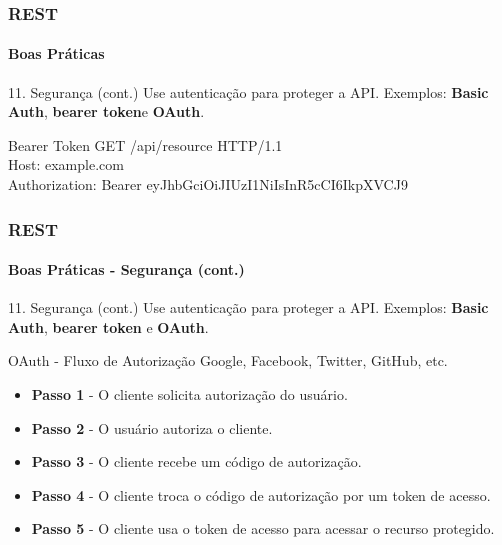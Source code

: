 \documentclass[
	10pt, %
	t, %
]{beamer}
\begin{document}
\begin{frame}
	\frametitle{REST}
	\framesubtitle{Boas Práticas}
	
	\begin{block}{11. Segurança (cont.)}
		Use autenticação para proteger a API. Exemplos: 
		\textbf{Basic Auth}, 
		\textbf{bearer token}\footnotemark e 
		\textbf{OAuth}.
	\end{block}

	\begin{exampleblock}{Bearer Token}
		{ \small GET /api/resource HTTP/1.1 } \\
		{ \small Host: example.com } \\
		{ \small Authorization: Bearer eyJhbGciOiJIUzI1NiIsInR5cCI6IkpXVCJ9 } \\
	\end{exampleblock}


\end{frame}

\begin{frame}
	\frametitle{REST}
	\framesubtitle{Boas Práticas - Segurança (cont.)}
	
	\begin{block}{11. Segurança (cont.)}
		Use autenticação para proteger a API. Exemplos: 
		\textbf{Basic Auth}, 
		\textbf{bearer token} e 
		\textbf{OAuth}\footnotemark.
	\end{block}

	\begin{exampleblock}{OAuth - Fluxo de Autorização}
		Google, Facebook, Twitter, GitHub, etc.
		\begin{itemize}
			\item \textbf{Passo 1} - O cliente solicita autorização do usuário.
			\item \textbf{Passo 2} - O usuário autoriza o cliente.
			\item \textbf{Passo 3} - O cliente recebe um código de autorização.
			\item \textbf{Passo 4} - O cliente troca o código de autorização por um token de acesso.
			\item \textbf{Passo 5} - O cliente usa o token de acesso para acessar o recurso protegido.
		\end{itemize}
	\end{exampleblock}



\end{frame}
\end{document}
